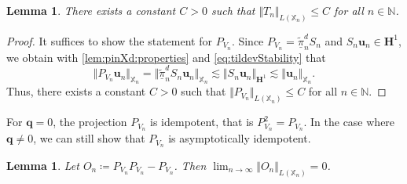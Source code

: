 \documentclass{m2an}
\renewcommand{\u}{\mathbf{u}}
\newcommand{\q}{\mathbf{q}} %
\newcommand{\Xn}{\mathbb{X}_n}
\newcommand{\bH}{{\mathbf H}}
\newcommand{\N}{\mathbb{N}}
\newcommand{\pinXd}{\underline{\tilde{\pi}}_n^d}
\newcommand{\Sol}{S_n}
\theoremstyle{plain}
\newtheorem{lemma}[theorem]{Lemma}
\theoremstyle{definition}
\begin{document}
\begin{lemma}\label{lem:PVnBounded}
   There exists a constant $C > 0$ such that $\Vert T_n \Vert_{L(\Xn)} \le C$ for all $n \in \N$.
\end{lemma}

\begin{proof}
   It suffices to show the statement for $P_{V_n}$. Since $P_{V_n} = \pinXd \Sol$ and $\Sol \u_n \in \bH^1$, we obtain with \cref{lem:pinXd:properties} and \eqref{eq:tildevStability} that  
   \begin{equation}
      \Vert P_{V_n} \u_n \Vert_{\Xn} = \Vert \pinXd \Sol \u_n \Vert_{\Xn} \lesssim \Vert \Sol \u_n \Vert_{\bH^1} \lesssim \Vert \u_n \Vert_{\Xn}. 
   \end{equation}
   Thus, there exists a constant $C > 0$ such that $\Vert P_{V_n} \Vert_{L(\Xn)} \le C$ for all $n \in \N$.
\end{proof}

For $\q = 0$, the projection $P_{V_n}$ is idempotent, that is $P_{V_n}^2 = P_{V_n}$. In the case where $\q \not = 0$, we can still show that $P_{V_n}$ is asymptotically idempotent. 
\begin{lemma}\label{lem:PvIdempotent}
   Let $O_n \coloneqq P_{V_n} P_{V_n} - P_{V_n}$. Then $\lim_{n \to \infty} \Vert O_n \Vert_{L(\Xn)} = 0$. 
\end{lemma}
\end{document}
